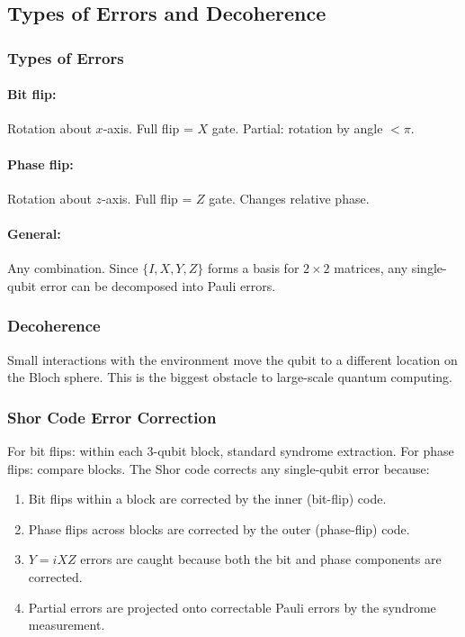 \documentclass[10pt,a4paper]{article}
\begin{document}
\subsection{Types of Errors and Decoherence}

\subsubsection*{Types of Errors}

\paragraph{Bit flip:} Rotation about $x$-axis. Full flip = $X$ gate. Partial: rotation by angle $<\pi$.
\paragraph{Phase flip:} Rotation about $z$-axis. Full flip = $Z$ gate. Changes relative phase.
\paragraph{General:} Any combination. Since $\{I,X,Y,Z\}$ forms a basis for $2\times 2$ matrices, any single-qubit error can be decomposed into Pauli errors.

\subsubsection*{Decoherence}

Small interactions with the environment move the qubit to a different location on the Bloch sphere. This is the biggest obstacle to large-scale quantum computing.

\subsubsection*{Shor Code Error Correction}

For bit flips: within each 3-qubit block, standard syndrome extraction. For phase flips: compare blocks. The Shor code corrects any single-qubit error because:
\begin{enumerate}[nosep]
\item Bit flips within a block are corrected by the inner (bit-flip) code.
\item Phase flips across blocks are corrected by the outer (phase-flip) code.
\item $Y=iXZ$ errors are caught because both the bit and phase components are corrected.
\item Partial errors are projected onto correctable Pauli errors by the syndrome measurement.
\end{enumerate}
\end{document}

